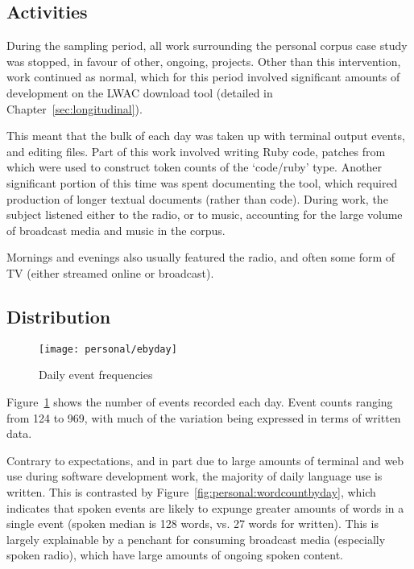 




\subsection{Activities}
During the sampling period, all work surrounding the personal corpus case study was stopped, in favour of other, ongoing, projects.  Other than this intervention, work continued as normal, which for this period involved significant amounts of development on the LWAC download tool (detailed in Chapter~\ref{sec:longitudinal}).

This meant that the bulk of each day was taken up with terminal output events, and editing files.  Part of this work involved writing Ruby code, patches from which were used to construct token counts of the `code/ruby' type.  Another significant portion of this time was spent documenting the tool, which required production of longer textual documents (rather than code).  During work, the subject listened either to the radio, or to music, accounting for the large volume of broadcast media and music in the corpus.

Mornings and evenings also usually featured the radio, and often some form of TV (either streamed online or broadcast).







\subsection{Distribution}

\begin{figure}[hp]
    \centering
    \texttt{[image: personal/ebyday]}
    \caption{Daily event frequencies}
    \label{fig:personal:eventcountbyday}
\end{figure}


Figure~\ref{fig:personal:eventcountbyday} shows the number of events recorded each day.  Event counts ranging from 124 to 969, with much of the variation being expressed in terms of written data.

Contrary to expectations, and in part due to large amounts of terminal and web use during software development work, the majority of daily language use is written.  This is contrasted by Figure~\ref{fig:personal:wordcountbyday}, which indicates that spoken events are likely to expunge greater amounts of words in a single event (spoken median is 128 words, vs. 27 words for written).  This is largely explainable by a penchant for consuming broadcast media (especially spoken radio), which have large amounts of ongoing spoken content.


